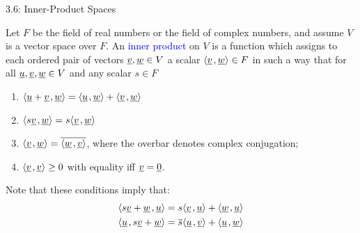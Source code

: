\documentclass[10pt,letterpaper,english]{beamer}
\begin{document}
\begin{frame}{3.6: Inner-Product Spaces}
\begin{definition} \label{definition:InnerProduct}
Let $F$ be the field of real numbers or the field of complex numbers, and assume $V$ is a vector space over $F$.
An \textcolor{blue}{inner product} on $V$ is a function which assigns to each ordered pair of vectors $\underline{v}, \underline{w} \in V$ a scalar ${\left\langle  \underline{v}  \mskip2mu ,  \underline{w}  \right\rangle} \in F$ in such a way that for all $\underline{u}, \underline{v}, \underline{w} \in V$ and any scalar $s \in F$
\begin{enumerate}
\item ${\left\langle  \underline{u} + \underline{v}  \mskip2mu ,  \underline{w}  \right\rangle}
= {\left\langle  \underline{u}  \mskip2mu ,  \underline{w}  \right\rangle}
+ {\left\langle  \underline{v}  \mskip2mu ,  \underline{w}  \right\rangle}$
\item ${\left\langle  s \underline{v}  \mskip2mu ,  \underline{w}  \right\rangle}
= s {\left\langle  \underline{v}  \mskip2mu ,  \underline{w}  \right\rangle}$
\item ${\left\langle  \underline{v}  \mskip2mu ,  \underline{w}  \right\rangle}
= \overline{ {\left\langle  \underline{w}  \mskip2mu ,  \underline{v}  \right\rangle} }$, where the overbar denotes complex conjugation;
\item ${\left\langle  \underline{v}  \mskip2mu ,  \underline{v}  \right\rangle} \geq 0$ with equality iff $\underline{v} = \underline{0}$.
\end{enumerate}
\end{definition}

\vspace{2mm}
Note that these conditions imply that:
\begin{align*}
{\left\langle  s \underline{v} + \underline{w}  \mskip2mu ,  \underline{u}   \right\rangle}
&= s {\left\langle  \underline{v}  \mskip2mu ,  \underline{u}  \right\rangle}
+ {\left\langle  \underline{w}  \mskip2mu ,  \underline{u}  \right\rangle} \\
{\left\langle  \underline{u}  \mskip2mu ,  s \underline{v} + \underline{w}  \right\rangle}
&= \overline{s} {\left\langle  \underline{u}  \mskip2mu ,  \underline{v}  \right\rangle}
+ {\left\langle  \underline{u}  \mskip2mu ,  \underline{w}  \right\rangle}
\end{align*}
\end{frame}
\end{document}
